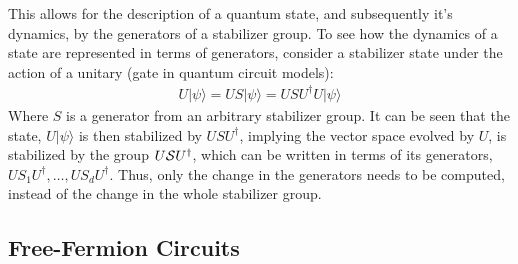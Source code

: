 This allows for the description of a quantum state, and subsequently it's dynamics, by the generators
of a stabilizer group. To see how the dynamics of a state are represented in terms of generators, consider
a stabilizer state under the action of a unitary (gate in quantum circuit models):
\begin{align}
    U|\psi \rangle = US|\psi \rangle =  USU^{\dagger}U|\psi\rangle
\end{align}
Where $S$ is a generator from an arbitrary stabilizer group.
It can be seen that the state, $U|\psi \rangle$ is then stabilized by $USU^{\dagger}$, implying the
vector space evolved by $U$, is stabilized by the group $U{\cal S}U^{\dagger}$, which can be written
in terms of its generators, $US_1U^{\dagger}, \dots, US_dU^{\dagger}$. Thus, only the change in the
generators needs to be computed, instead of the change in the whole stabilizer group.


\subsection{Free-Fermion Circuits}











